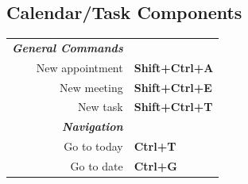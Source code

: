 \documentclass[12pt]{article}
\begin{document}
\begin{landscape}
\begin{center}
\begin{multicols}{2}
	\section*{Calendar/Task Components}
	\begin{tabular*}{4in}{rp{1.5in}}
		\textit{\textbf{General Commands}}	&					\\
		New appointment				& \textbf{Shift+Ctrl+A}			\\
		New meeting				& \textbf{Shift+Ctrl+E}			\\
		\vspace{1.5mm}
		New task				& \textbf{Shift+Ctrl+T}			\\
		\textit{\textbf{Navigation}}		&					\\
		Go to today				& \textbf{Ctrl+T}			\\
		Go to date				& \textbf{Ctrl+G}			\\
	\end{tabular*}
	\end{multicols}
	\end{center}
	\end{landscape}
 
\end{document}
